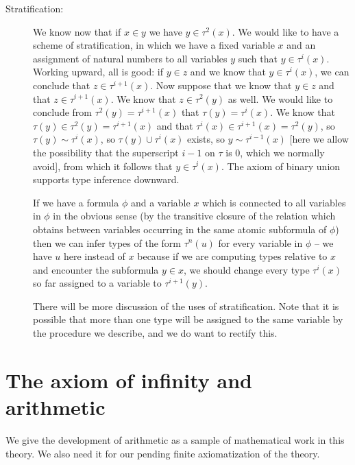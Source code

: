 \documentclass[12pt]{article}
\begin{document}
\begin{description}
\item[Stratification:]  We know now that if $x \in y$ we have $y \in \tau^2(x)$.   We would like to have a scheme of stratification, in which we have a fixed variable $x$
and an assignment of natural numbers to all variables $y$ such that $y \in \tau^i(x)$.  Working upward, all is good:  if $y \in z$ and we know that $y \in \tau^i(x)$, we can conclude
that $z \in \tau^{i+1}(x)$.  Now suppose that we know that $y \in z$ and that $z \in \tau^{i+1}(x)$.  We know that $z \in \tau^2(y)$ as well.   We would like to conclude
from $\tau^2(y) = \tau^{i+1}(x)$ that $\tau(y) = \tau^i(x)$.  We know that $\tau(y) \in \tau^2(y) = \tau^{i+1}(x)$ and that $\tau^i(x) \in \tau^{i+1}(x)=\tau^2(y)$, so
$\tau(y) \sim \tau^i(x)$, so $\tau(y) \cup \tau^i(x)$ exists, so  $y \sim \tau^{i-1}(x)$ [here we allow the possibility that the superscript $i-1$ on $\tau$ is 0, which we normally avoid], from which it follows
that $y \in \tau^i(x)$.  The axiom of binary union supports type inference downward.  

If we have a formula $\phi$ and a variable $x$ which is connected to all variables in $\phi$ in the obvious sense (by the transitive closure of the relation which obtains between variables occurring in the same atomic subformula of $\phi$) then we can infer types of the form $\tau^n(u)$ for every variable in $\phi$ -- we have $u$ here instead of $x$ because if we are computing types relative to $x$ and encounter the subformula $y \in x$, we should change every type $\tau^i(x)$ so far assigned to a variable to $\tau^{i+1}(y)$.

There will be more discussion of the uses of stratification.  Note that it is possible that more than one type will be assigned to the same variable by the procedure we describe, and we do want to rectify this.

\end{description}

\section{The axiom of infinity and arithmetic}

We give the development of arithmetic as a sample of mathematical work in this theory.  We also need it for our pending finite axiomatization of the theory.
\end{document}
